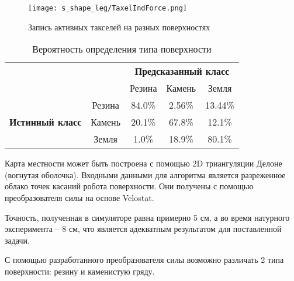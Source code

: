 \begin{figure}[H]
    \centering\texttt{[image: s\_shape\_leg/TaxelIndForce.png]}
    \caption{Запись активных такселей на разных поверхностях}
    \label{fig:s_shape_leg/TaxelIndForce_full.png}
\end{figure}

\begin{table}[H]
    \caption{Вероятность определения типа поверхности}
    \label{tabular:prob_terrain_classification}
    \centering
\begin{tabular}{|c|c|c|c|c|} 
    \cline{3-5}
    \multicolumn{1}{l}{} & \multicolumn{1}{l|}{} & \multicolumn{3}{c|}{\textbf{Предсказанный класс}} \\ 
    \cline{3-5}
    \multicolumn{1}{l}{} &  & Резина & Камень & Земля \\ 
    \hline
    \multirow{3}{*}{{\textbf{Истинный класс}}} & Резина & {\cellcolor[rgb]{0.741,0.843,0.929}}84.0\% & 2.56\% & 13.44\% \\ 
    \hhline{|~----|}
     & Камень & 20.1\% & {\cellcolor[rgb]{0.741,0.843,0.929}}67.8\% & 12.1\% \\ 
    \hhline{|~----|}
     & Земля & 1.0\% & 18.9\% & {\cellcolor[rgb]{0.741,0.843,0.929}}80.1\% \\
    \hline
    \end{tabular}
\end{table}

Карта местности может быть построена с помощью 2D триангуляции Делоне (вогнутая оболочка). Входными данными для алгоритма является разреженное облако точек касаний робота поверхности. Они получены с помощью преобразователя силы на основе Velostat.

Точность, полученная в симуляторе равна примерно 5 см, а во время натурного эксперимента -- 8 см, что является адекватным результатом для поставленной задачи.

С помощью разработанного преобразователя силы возможно различать 2 типа поверхности: резину и каменистую гряду.